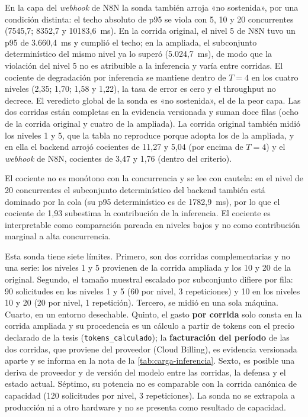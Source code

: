En la capa del \emph{webhook} de N8N la sonda también arroja «no sostenida», por una condición distinta: el techo absoluto de p95 se viola con 5, 10 y 20 concurrentes (7545,7; 8352,7 y 10183,6~ms). En la corrida original, el nivel 5 de N8N tuvo un p95 de 3.660,4~ms y cumplió el techo; en la ampliada, el subconjunto determinístico del mismo nivel ya lo superó (5.024,7~ms), de modo que la violación del nivel 5 no es atribuible a la inferencia y varía entre corridas. El cociente de degradación por inferencia se mantiene dentro de $T = 4$ en los cuatro niveles (2,35; 1,70; 1,58 y 1,22), la tasa de error es cero y el throughput no decrece. El veredicto global de la sonda es «no sostenida», el de la peor capa. Las dos corridas están completas en la evidencia versionada y suman doce filas (ocho de la corrida original y cuatro de la ampliada). La corrida original también midió los niveles 1 y 5, que la tabla no reproduce porque adopta los de la ampliada, y en ella el backend arrojó cocientes de 11,27 y 5,04 (por encima de $T = 4$) y el \emph{webhook} de N8N, cocientes de 3,47 y 1,76 (dentro del criterio).

El cociente no es monótono con la concurrencia y se lee con cautela: en el nivel de 20 concurrentes el subconjunto determinístico del backend también está dominado por la cola (su p95 determinístico es de 1782,9~ms), por lo que el cociente de 1,93 subestima la contribución de la inferencia. El cociente es interpretable como comparación pareada en niveles bajos y no como contribución marginal a alta concurrencia.

Esta sonda tiene siete límites. Primero, son dos corridas complementarias y no una serie: los niveles 1 y 5 provienen de la corrida ampliada y los 10 y 20 de la original. Segundo, el tamaño muestral escalado por subconjunto difiere por fila: 90 solicitudes en los niveles 1 y 5 (60 por nivel, 3 repeticiones) y 10 en los niveles 10 y 20 (20 por nivel, 1 repetición). Tercero, se midió en una sola máquina. Cuarto, en un entorno desechable. Quinto, el gasto \textbf{por corrida} solo consta en la corrida ampliada y su procedencia es un cálculo a partir de tokens con el precio declarado de la tesis (\texttt{tokens\_calculado}); la \textbf{facturación del período} de las dos corridas, que proviene del proveedor (Cloud Billing), es evidencia versionada aparte y se informa en la nota de la \autoref{tab:carga-inferencia}. Sexto, es posible una deriva de proveedor y de versión del modelo entre las corridas, la defensa y el estado actual. Séptimo, su potencia no es comparable con la corrida canónica de capacidad (120 solicitudes por nivel, 3 repeticiones). La sonda no se extrapola a producción ni a otro hardware y no se presenta como resultado de capacidad.

\newpage
